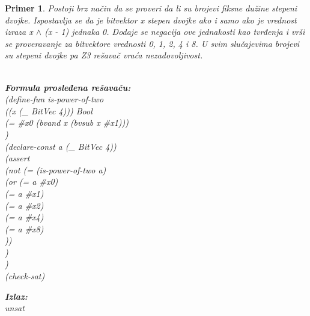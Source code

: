 \documentclass[12pt,oneside]{memoir}
\newcommand\tab[1][0.5cm]{\hspace*{#1}}
\newtheorem{primer}{Primer}
\begin{document}
\par
\begin{primer} 
Postoji brz način da se proveri da li su brojevi fiksne dužine stepeni dvojke. 
Ispostavlja se da je bitvektor x stepen dvojke ako i samo ako je vrednost izraza x $\land$ (x - 1) jednaka 0. Dodaje se negacija ove jednakosti kao tvrđenja i vrši se proveravanje za bitvektore vrednosti 0, 1, 2, 4 i 8. U svim slučajevima brojevi su stepeni dvojke pa Z3 rešavač vraća nezadovoljivost.\\ \\
\begin{minipage}[b]{0.5\textwidth}
\textbf{Formula prosleđena rešavaču:}
\\(define-fun is-power-of-two 
\\\tab((x (\_ BitVec 4))) Bool 
\\\tab(= \#x0 (bvand x (bvsub x \#x1)))
\\)
\\(declare-const a (\_ BitVec 4))
\\(assert 
\\\tab(not (= (is-power-of-two a) 
\\\tab\tab    (or (= a \#x0) 
\\\tab\tab\tab     (= a \#x1) 
\\\tab\tab\tab     (= a \#x2) 
\\\tab\tab\tab     (= a \#x4) 
\\\tab\tab\tab     (= a \#x8)
\\\tab\tab		))
\\\tab )
\\)
\\(check-sat)
\end{minipage}
\hspace{2.5cm}
\begin{minipage}[t]{0.5\textwidth}
\vspace{-10.45cm}
\textbf{Izlaz:}
\\unsat
\end{minipage}
\end{primer}
\end{document}
